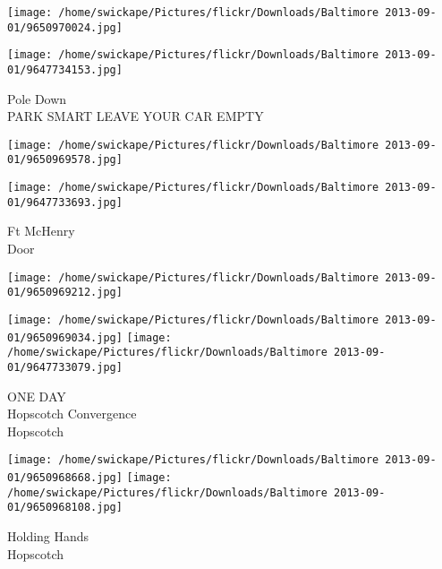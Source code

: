 \documentclass[10pt,letterpaper]{article}
\begin{document}
\texttt{[image: /home/swickape/Pictures/flickr/Downloads/Baltimore 2013-09-01/9650970024.jpg]}

\vspace{0.25in}
\texttt{[image: /home/swickape/Pictures/flickr/Downloads/Baltimore 2013-09-01/9647734153.jpg]}

Pole Down\\
PARK SMART LEAVE YOUR CAR EMPTY\\
\pagebreak

\texttt{[image: /home/swickape/Pictures/flickr/Downloads/Baltimore 2013-09-01/9650969578.jpg]}

\vspace{0.25in}
\texttt{[image: /home/swickape/Pictures/flickr/Downloads/Baltimore 2013-09-01/9647733693.jpg]}

Ft McHenry\\
Door\\
\pagebreak

\texttt{[image: /home/swickape/Pictures/flickr/Downloads/Baltimore 2013-09-01/9650969212.jpg]}

\vspace{0.25in}
\texttt{[image: /home/swickape/Pictures/flickr/Downloads/Baltimore 2013-09-01/9650969034.jpg]}
\texttt{[image: /home/swickape/Pictures/flickr/Downloads/Baltimore 2013-09-01/9647733079.jpg]}

ONE DAY\\
Hopscotch Convergence\\
Hopscotch\\
\pagebreak

\texttt{[image: /home/swickape/Pictures/flickr/Downloads/Baltimore 2013-09-01/9650968668.jpg]}
\texttt{[image: /home/swickape/Pictures/flickr/Downloads/Baltimore 2013-09-01/9650968108.jpg]}

Holding Hands\\
Hopscotch\\
\pagebreak
\end{document}
